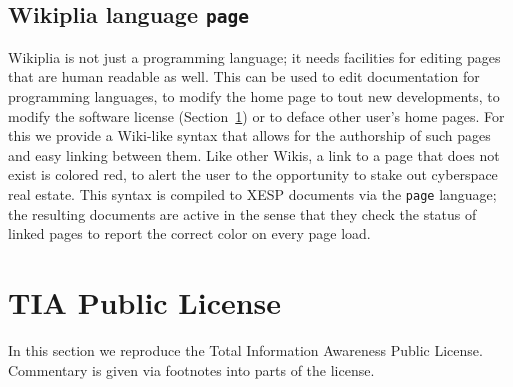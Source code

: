 \documentclass[twocolumn]{article}
\begin{document}
\subsection{Wikiplia language {\tt page}}

Wikiplia is not just a programming language; it needs facilities for
editing pages that are human readable as well. This can be used to
edit documentation for programming languages, to modify the home page
to tout new developments, to modify the software license
(Section~\ref{sec:license}) or to deface other user's home pages. For
this we provide a Wiki-like syntax that allows for the
authorship of such pages and easy linking between them. Like other
Wikis, a link to a page that does not exist is colored red, to alert
the user to the opportunity to stake out cyberspace real estate. This
syntax is compiled to XESP documents via the {\tt page} language; the
resulting documents are active in the sense that they check the status
of linked pages to report the correct color on every page load.

\section{TIA Public License} \label{sec:license}

In this section we reproduce the Total Information Awareness Public
License. Commentary is given via footnotes into parts
of the license.
\end{document}
